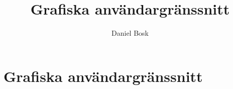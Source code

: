 \documentclass[a4paper,10pt,oneside,openright,
               oldfontcommands]{memoir}
\begin{document}
\title{%
  Grafiska användargränssnitt
}
\author{Daniel Bosk}

\maketitle

\begin{abstract}
  
\end{abstract}

\clearpage

\tableofcontents*

\chapter{Grafiska användargränssnitt}



\appendix


\printbibliography
\end{document}
